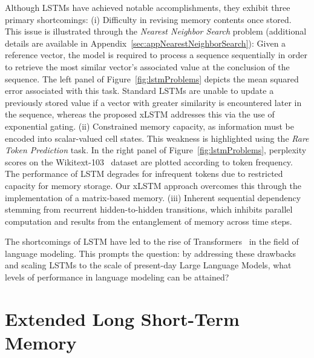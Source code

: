 Although LSTMs have achieved notable accomplishments, they exhibit three primary shortcomings: (i) Difficulty in revising memory contents once stored. This issue is illustrated through the {\it Nearest Neighbor Search} problem (additional details are available in Appendix~\ref{sec:appNearestNeighborSearch}): Given a reference vector, the model is required to process a sequence sequentially in order to retrieve the most similar vector’s associated value at the conclusion of the sequence. The left panel of Figure~\ref{fig:lstmProblems} depicts the mean squared error associated with this task. Standard LSTMs are unable to update a previously stored value if a vector with greater similarity is encountered later in the sequence, whereas the proposed xLSTM addresses this via the use of exponential gating. (ii) Constrained memory capacity, as information must be encoded into scalar-valued cell states. This weakness is highlighted using the {\it Rare Token Prediction} task. In the right panel of Figure~\ref{fig:lstmProblems}, perplexity scores on the Wikitext-103~\citep{Merity:17} dataset are plotted according to token frequency. The performance of LSTM degrades for infrequent tokens due to restricted capacity for memory storage. Our xLSTM approach overcomes this through the implementation of a matrix-based memory. (iii) Inherent sequential dependency stemming from recurrent hidden-to-hidden transitions, which inhibits parallel computation and results from the entanglement of memory across time steps.

The shortcomings of LSTM have led to the rise of Transformers~\citep{Vaswani:17} in the field of language modeling. This prompts the question: by addressing these drawbacks and scaling LSTMs to the scale of present-day Large Language Models, what levels of performance in language modeling can be attained?

\section{Extended Long Short-Term Memory}
\label{sec:xLSTM}

